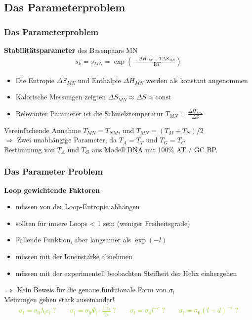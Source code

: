 \subsection{Das Parameterproblem}
\begin{frame}
\frametitle{Das Parameterproblem}

\textbf{Stabilitätsparameter} des Basenpaars MN
\begin{align*}
s_k=s_{MN}=\exp\left(-\frac{\Delta H_{MN}-T\Delta S_{MN}}{\text{R}T}\right)
\end{align*}
\begin{itemize}
\item Die Entropie $\Delta S_{MN}$ und Enthalpie $\Delta H_{MN}$ werden als konstant angenommen
\item Kalorische Messungen zeigten $\Delta S_{MN}\approx \Delta S \approx \text{const}$
\item Relevanter Parameter ist die Schmelztemperatur $T_{MN}=\frac{\Delta H_{MN}}{\Delta S}$
\end{itemize}
\vspace{0.4cm}
Vereinfachende Annahme $T_{MN}=T_{NM}$, und $T_{MN}=(T_M+T_N)/2$\\
$\Rightarrow$ Zwei unabhängige Parameter, da $T_A=T_T$ und $T_G=T_C$\\
\vspace{0.3cm}
Bestimmung von $T_A$ und $T_G$ aus Modell DNA mit 100\% AT / GC BP.
\end{frame}



\begin{frame}
\frametitle{Das Parameter Problem}
\textbf{Loop gewichtende Faktoren}
\begin{itemize}
\item müssen von der Loop-Entropie abhängen
\item sollten für innere Loops < 1 sein (weniger Freiheitsgrade)
\item Fallende Funktion, aber langsamer als $\exp(-l)$
\item müssen mit der Ionenstärke abnehmen
\item müssen mit der experimentell beobachten Steifheit der Helix einhergehen
\end{itemize}
\vspace{0.3cm}
\centering
$\Rightarrow$ Kein Beweis für die genaue funktionale Form von $\sigma_l$\\
Meinungen gehen stark auseinander!
\vspace{0.2cm}
\textcolor{YellowGreen}{
\small{
\begin{align*}
\sigma_l=\sigma_0 \lambda_l \epsilon_l \; \text{?} \qquad \sigma_l=\sigma_0\Psi_l\cdot\frac{l\cdot c_l}{c_\infty}\; \text{?}\qquad \sigma_l=\sigma_0 l^{-c}\;\text{?}\qquad \sigma_l=\sigma_0 (l-d)^{-c}\;\text{?}
\end{align*}}}
\end{frame}


